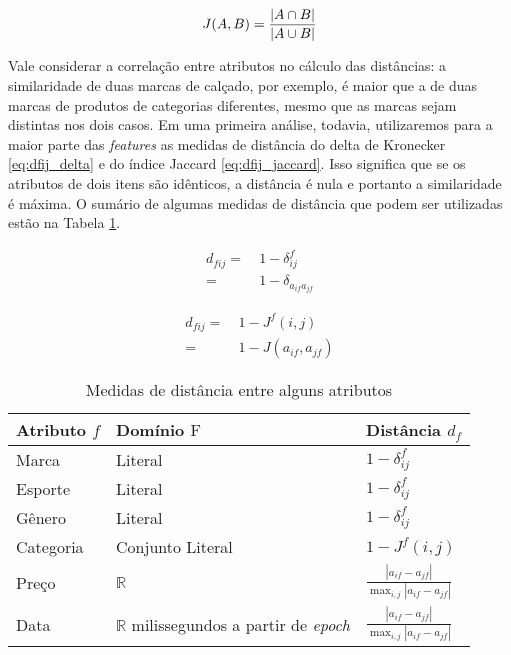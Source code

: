 \begin{equation}
\label{eq:jaccard}
J(A,B) ={{|A \cap B|}\over{|A \cup B|}}
\end{equation}

Vale considerar a correlação entre atributos no cálculo das distâncias: a similaridade de duas marcas de calçado, por exemplo, é maior que a de duas marcas de produtos de categorias diferentes, mesmo que as marcas sejam distintas nos dois casos. Em uma primeira análise, todavia, utilizaremos para a maior parte das \textit{features} as medidas de distância do delta de Kronecker \ref{eq:dfij_delta} e do índice Jaccard \ref{eq:dfij_jaccard}. Isso significa que se os atributos de dois itens são idênticos, a distância é nula e portanto a similaridade é máxima. O sumário de algumas medidas de distância que podem ser utilizadas estão na Tabela \ref{tab:medidas-distancia}.

\begin{equation}
\label{eq:dfij_delta}
\begin{split}
d_{fij} =&~ 1-\delta_{ij}^f \\
    =&~ 1-\delta_{a_{if} a_{jf}}
\end{split} 
\end{equation}

\begin{equation}
\label{eq:dfij_jaccard}
\begin{split}
d_{fij} =&~ 1-J^f(i,j) \\
    =&~ 1-J(a_{if},a_{jf})
\end{split} 
\end{equation}

\begin{table}[h]
\begin{center}
    \caption{Medidas de distância entre alguns atributos}
    \label{tab:medidas-distancia}
    \begin{tabular}{  | >{\arraybackslash} m{3cm} | >{\arraybackslash} m{3cm} | >{\centering\arraybackslash} m{3cm} | } 
    \hline
    \textbf{Atributo} $f$ & \textbf{Domínio} $\mathrm{F}$ & \textbf{Distância} $d_f$ \\ \hline
    Marca & Literal & $1-\delta^f_{ij}$ \\ \hline    
    Esporte & Literal & $1-\delta^f_{ij}$ \\ \hline
    Gênero & Literal & $1-\delta^f_{ij}$ \\ \hline            
    Categoria & Conjunto Literal & $1-J^f(i,j)$ \\ \hline            
    Preço & $\mathbb{R}$ & $ \frac{\left| a_{if}-a_{jf} \right|}{\max_{i,j}{\left| a_{if}-a_{jf} \right|}} $ \\ \hline
    Data & $\mathbb{R}$ milissegundos a partir de \textit{epoch} \cite{epoch} & $ \frac{\left| a_{if}-a_{jf} \right|}{\max_{i,j}{\left| a_{if}-a_{jf} \right|}} $ \\ \hline
    \end{tabular}
\end{center}
\end{table}
 

